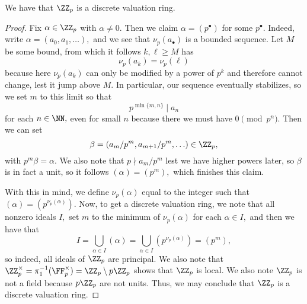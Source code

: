 \documentclass[../notes.tex]{subfiles}
\begin{document}
\begin{proposition}
	We have that $\ZZ_p$ is a discrete valuation ring.
\end{proposition}
\begin{proof}
	Fix $\alpha\in\ZZ_p$ with $\alpha\ne0.$ Then we claim $\alpha=\left(p^\bullet\right)$ for some $p^\bullet.$ Indeed, write $\alpha=(a_0,a_1,\ldots),$ and we see that $\nu_p(a_\bullet)$ is a bounded sequence. Let $M$ be some bound, from which it follows $k,\ell\ge M$ has
	\[\nu_p(a_k)=\nu_p(\ell)\]
	because here $\nu_p(a_k)$ can only be modified by a power of $p^k$ and therefore cannot change, lest it jump above $M.$ In particular, our sequence eventually stabilizes, so we set $m$ to this limit so that
	\[p^{\min\{m,n\}}\mid a_n\]
	for each $n\in\NN,$ even for small $n$ because there we must have $0\pmod{p^n}.$ Then we can set
	\[\beta=(a_m/p^m,a_{m+1}/p^m,\ldots)\in\ZZ_p,\]
	with $p^m\beta=\alpha.$ We also note that $p\nmid a_m/p^m$ lest we have higher powers later, so $\beta$ is in fact a unit, so it follows $(\alpha)=\left(p^m\right),$ which finishes this claim.

	With this in mind, we define $\nu_p(\alpha)$ equal to the integer such that $(\alpha)=\left(p^{\nu_p(\alpha)}\right).$ Now, to get a discrete valuation ring, we note that all nonzero ideals $I,$ set $m$ to the minimum of $\nu_p(\alpha)$ for each $\alpha\in I,$ and then we have that
	\[I=\bigcup_{\alpha\in I}(\alpha)=\bigcup_{\alpha\in I}\left(p^{\nu_p(\alpha)}\right)=\left(p^m\right),\]
	so indeed, all ideals of $\ZZ_p$ are principal. We also note that $\ZZ_p^\times=\pi_1^{-1}(\FF_p^\times)=\ZZ_p\setminus p\ZZ_p$ shows that $\ZZ_p$ is local. We also note $\ZZ_p$ is not a field because $p\ZZ_p$ are not units. Thus, we may conclude that $\ZZ_p$ is a discrete valuation ring.
\end{proof}
\end{document}
